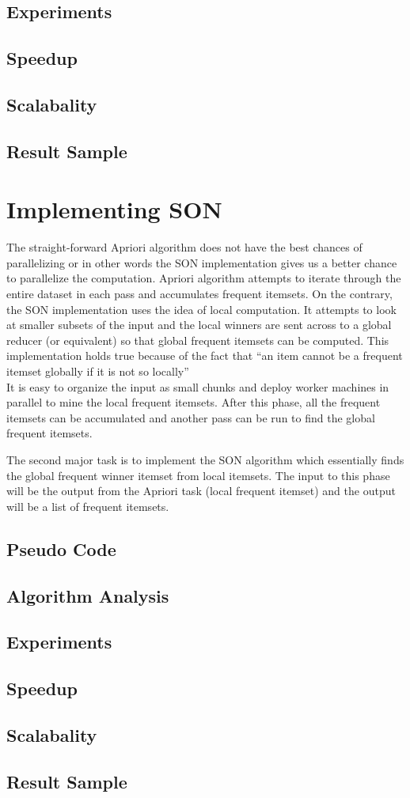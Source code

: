 \documentclass[11pt]{article}
\begin{document}
\subsection {Experiments}
\subsection {Speedup}
\subsection {Scalabality}
\subsection {Result Sample}
 
\section{Implementing SON}
The straight-forward Apriori algorithm does not have the best chances of parallelizing or in other words the SON implementation gives us a better chance to parallelize the computation. Apriori algorithm attempts to iterate through the entire dataset in each pass and accumulates frequent itemsets. On the contrary, the SON implementation uses the idea of local computation. It attempts to look at smaller subsets of the input and the local winners are sent across to a global reducer (or equivalent) so that global frequent itemsets can be computed. This implementation holds true because of the fact that “an item cannot be a frequent itemset globally if it is not so locally”\\
It is easy to organize the input as small chunks and deploy worker machines in parallel to mine the local frequent itemsets. After this phase, all the frequent itemsets can be accumulated and another pass can be run to find the global frequent itemsets.

The second major task is to implement the SON algorithm which essentially finds the global frequent winner itemset from local itemsets. The input to this phase will be the output from the Apriori task (local frequent itemset) and the output will be a list of frequent itemsets.\\
\subsection {Pseudo Code}
\subsection {Algorithm Analysis}
\subsection {Experiments}
\subsection {Speedup}
\subsection {Scalabality}
\subsection {Result Sample}
\end{document}
